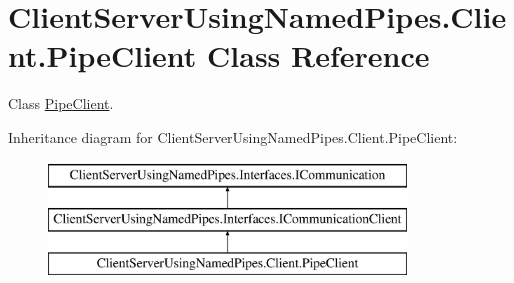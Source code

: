 \hypertarget{class_client_server_using_named_pipes_1_1_client_1_1_pipe_client}{}\section{Client\+Server\+Using\+Named\+Pipes.\+Client.\+Pipe\+Client Class Reference}
\label{class_client_server_using_named_pipes_1_1_client_1_1_pipe_client}


Class \hyperlink{class_client_server_using_named_pipes_1_1_client_1_1_pipe_client}{Pipe\+Client}.  


Inheritance diagram for Client\+Server\+Using\+Named\+Pipes.\+Client.\+Pipe\+Client\+:\begin{figure}[H]
\begin{center}
\leavevmode
\includegraphics[height=3.000000cm]{class_client_server_using_named_pipes_1_1_client_1_1_pipe_client}
\end{center}
\end{figure}
